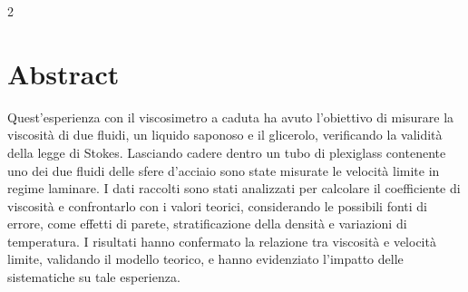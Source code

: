 \documentclass{article}
\begin{document}
\begin{multicols}{2}
\setlength{\columnsep}{10mm}

\section{Abstract}
Quest'esperienza con il viscosimetro a caduta ha avuto l'obiettivo di misurare la viscosità di due fluidi, un liquido saponoso e il glicerolo, verificando la validità della legge di Stokes. Lasciando cadere dentro un tubo di plexiglass contenente uno dei due fluidi delle sfere d'acciaio sono state misurate le velocità limite in regime laminare. I dati raccolti sono stati analizzati per calcolare il coefficiente di viscosità e confrontarlo con i valori teorici, considerando le possibili fonti di errore, come effetti di parete, stratificazione della densità e variazioni di temperatura. I risultati hanno confermato la relazione tra viscosità e velocità limite, validando il modello teorico, e hanno evidenziato l'impatto delle sistematiche su tale esperienza.




\end{multicols}
\end{document}
